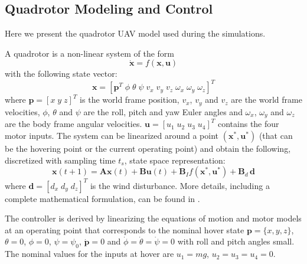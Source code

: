 \documentclass[letterpaper, 10 pt, conference]{ieeeconf}  %
\begin{document}
\subsection{Quadrotor Modeling and Control}
Here we present the quadrotor UAV model used during the simulations.

A quadrotor is a non-linear system of the form 
\begin{equation}
\dot{\bm{x}} = f(\bm{x}, \bm{u})
\end{equation}
with the following state vector:
\begin{equation}
 \bm{x} = \left[ \bm{p}^{T}\; \phi \;  \theta \;  \psi \;  v_x \;  v_y \;  v_z \;  \omega_{x} \;  \omega_{y} \;  \omega_{z} \right]^{T}
 \end{equation}
where $\bm{p}=[x \; y \; z]^{T}$ is the world frame position, $v_{x}$, $v_{y}$ and $v_z$ are the world frame velocities, $\phi$, $\theta$ and $\psi$ are the roll, pitch and yaw Euler angles and $\omega_{x}$, $\omega_{y}$ and $\omega_{z}$ are the body frame angular velocities. $\bm{u} = \left[ u_1\; u_2\; u_3\; u_4 \right]^{T}$ contains the four motor inputs.
The system can be linearized around a point $\left(\bm{x}^{*}, \bm{u}^{*}\right)$ (that can be the hovering point or the current operating point) and obtain the following, discretized with sampling time $t_s$, state space representation:
 \begin{equation}
 \bm{x}(t+1) =  \bm{A} \bm{x}(t) + \bm{B} \bm{u}(t) + \bm{B}_I f\left(\bm{x}^{*}, \bm{u}^{*}\right) + \bm{B}_d \, \bm{d}
 \end{equation}
where $\bm{d} = [d_x \; d_y \; d_z]^{T}$ is the wind disturbance. 
More details, including a complete mathematical formulation, can be found in \cite{bezzo2016online,bezzo2014cooperative, michael2010grasp, shoukry2015secure}.

The controller is derived by linearizing the equations of motion and motor models at an operating point that corresponds to the nominal hover state ${\bm p} = \{x, y, z\}$, $\theta = 0$, $\phi = 0$, $\psi = \psi_0$, ${\dot{\bm p} = 0}$ and $\dot{\phi} = \dot{\theta} = \dot{\psi} = 0$ with roll and pitch angles small. The nominal values for the inputs at hover are $u_1 = mg$, $u_2 = u_3 = u_4 = 0$.
\end{document}
